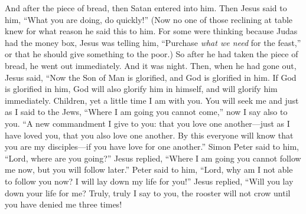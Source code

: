 \begin{biblechapter}
\verse And after the piece of bread, then Satan entered into him. Then Jesus said to him, “What you are doing, do quickly!”
\verse (Now no one of those reclining at table knew for what reason he said this to him.
\verse For some were thinking because Judas had the money box, Jesus was telling him, “Purchase \textit{what we need} for the feast,” or that he should give something to the poor.)
\verse So after he had taken the piece of bread, he went out immediately. And it was night.
 Then, when he had gone out, Jesus said, “Now the Son of Man is glorified, and God is glorified in him.
\verse If God is glorified in him, God will also glorify him in himself, and will glorify him immediately.
\verse Children, yet a little time I am with you. You will seek me and just as I said to the Jews, “Where I am going you cannot come,” now I say also to you.
\verse “A new commandment I give to you: that you love one another—just as I have loved you, that you also love one another.
\verse By this everyone will know that you are my disciples—if you have love for one another.”
\verse Simon Peter said to him, “Lord, where are you going?” Jesus replied, “Where I am going you cannot follow me now, but you will follow later.”
\verse Peter said to him, “Lord, why am I not able to follow you now? I will lay down my life for you!”
\verse Jesus replied, “Will you lay down your life for me? Truly, truly I say to you, the rooster will not crow until you have denied me three times!
\end{biblechapter}

